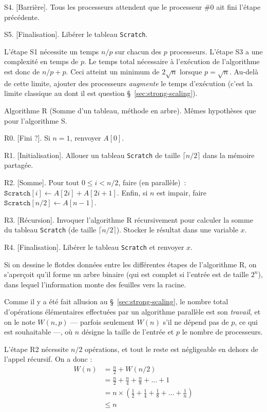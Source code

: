 \algstep S4. [Barrière]. Tous les processeurs attendent que le processeur \#0
ait fini l'étape précédente.

\algstep S5. [Finalisation]. Libérer le tableau \texttt{Scratch}.

L'étape S1 nécessite un temps $n/p$ sur chacun des $p$ processeurs. L'étape S3 a
une complexité en temps de $p$. Le temps total nécessaire à l'exécution de
l'algorithme est donc de $n/p+p$. Ceci atteint un minimum de $2\sqrt{n}$ lorsque
$p=\sqrt{n}$. Au-delà de cette limite, ajouter des processeurs \emph{augmente}
le temps d'exécution (c'est la limite classique au  dont
il est question §~\ref{sec:strong-scaling}).



\algbegin Algorithme R (Somme d'un tableau, méthode en arbre). Mêmes hypothèses
que pour l'algorithme S. 

\algstep R0. [Fini ?]. Si $n = 1$, renvoyer $A[0]$.

\algstep R1. [Initialisation]. Allouer un tableau \texttt{Scratch} de taille
$\lceil n / 2 \rceil$ dans la mémoire partagée.

\algstep R2. [Somme]. Pour tout $0 \leq i < n/2$, faire (en parallèle)~: $\texttt{Scratch}[i] \gets A[2i] + A[2i+1]$. Enfin, si $n$ est impair, faire $\texttt{Scratch}[n/2] \gets A[n-1]$.

\algstep R3. [Récursion]. Invoquer l'algorithme R récursivement pour calculer la
somme du tableau \texttt{Scratch} (de taille $\lceil n/2 \rceil$). Stocker le
résultat dans une variable $x$.

\algstep R4. [Finalisation]. Libérer le tableau \texttt{Scratch} et renvoyer $x$.


Si on dessine le \og flot\fg des données entre les différentes étapes de
l'algorithme R, on s'aperçoit qu'il forme un arbre binaire (qui est complet si
l'entrée est de taille $2^n$), dans lequel l'information monte des feuilles vers
la racine.

Comme il y a été fait allusion au §~\ref{sec:strong-scaling}, le nombre total
d'opérations élémentaires effectuées par un algorithme parallèle est son
\emph{travail}, et on le note $W(n, p)$ --- parfois seulement $W(n)$ s'il ne
dépend pas de $p$, ce qui est souhaitable ---, où $n$ désigne la taille de
l'entrée et $p$ le nombre de processeurs.

L'étape R2 nécessite $n/2$ opérations, et tout le reste est négligeable en
dehors de l'appel récursif. On a donc :
\begin{align}
  W(n) &= \frac{n}{2} + W(n/2) \\
       &= \frac{n}{2} + \frac{n}{4} + \frac{n}{8} +  \dots + 1\\
       &= n \times \left( \frac{1}{2} + \frac{1}{4} + \frac{1}{8} +  \dots + \frac{1}{n} \right)\\
       & \leq n
\end{align}

